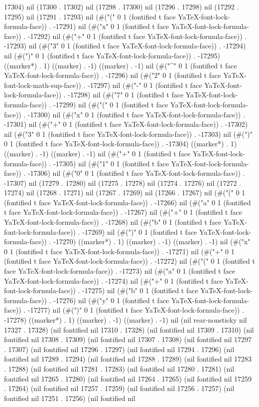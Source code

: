 17304) nil (17300 . 17302) nil (17298 . 17300) nil (17296 . 17298) nil (17292 . 17295) nil (17291 . 17293) nil (#("(" 0 1 (fontified t face YaTeX-font-lock-formula-face)) . -17291) nil (#("x" 0 1 (fontified t face YaTeX-font-lock-formula-face)) . -17292) nil (#("+" 0 1 (fontified t face YaTeX-font-lock-formula-face)) . -17293) nil (#("3" 0 1 (fontified t face YaTeX-font-lock-formula-face)) . -17294) nil (#(")" 0 1 (fontified t face YaTeX-font-lock-formula-face)) . -17295) ((marker*) . 1) ((marker) . -1) ((marker) . -1) nil (#("^" 0 1 (fontified t face YaTeX-font-lock-formula-face)) . -17296) nil (#("2" 0 1 (fontified t face YaTeX-font-lock-math-sup-face)) . -17297) nil (#("-" 0 1 (fontified t face YaTeX-font-lock-formula-face)) . -17298) nil (#("7" 0 1 (fontified t face YaTeX-font-lock-formula-face)) . -17299) nil (#("(" 0 1 (fontified t face YaTeX-font-lock-formula-face)) . -17300) nil (#("x" 0 1 (fontified t face YaTeX-font-lock-formula-face)) . -17301) nil (#("+" 0 1 (fontified t face YaTeX-font-lock-formula-face)) . -17302) nil (#("3" 0 1 (fontified t face YaTeX-font-lock-formula-face)) . -17303) nil (#(")" 0 1 (fontified t face YaTeX-font-lock-formula-face)) . -17304) ((marker*) . 1) ((marker) . -1) ((marker) . -1) nil (#("+" 0 1 (fontified t face YaTeX-font-lock-formula-face)) . -17305) nil (#("1" 0 1 (fontified t face YaTeX-font-lock-formula-face)) . -17306) nil (#("0" 0 1 (fontified t face YaTeX-font-lock-formula-face)) . -17307) nil (17279 . 17280) nil (17275 . 17278) nil (17274 . 17276) nil (17272 . 17274) nil (17268 . 17271) nil (17267 . 17269) nil (17266 . 17267) nil (#("(" 0 1 (fontified t face YaTeX-font-lock-formula-face)) . -17266) nil (#("a" 0 1 (fontified t face YaTeX-font-lock-formula-face)) . -17267) nil (#("+" 0 1 (fontified t face YaTeX-font-lock-formula-face)) . -17268) nil (#("b" 0 1 (fontified t face YaTeX-font-lock-formula-face)) . -17269) nil (#(")" 0 1 (fontified t face YaTeX-font-lock-formula-face)) . -17270) ((marker*) . 1) ((marker) . -1) ((marker) . -1) nil (#("x" 0 1 (fontified t face YaTeX-font-lock-formula-face)) . -17271) nil (#("+" 0 1 (fontified t face YaTeX-font-lock-formula-face)) . -17272) nil (#("(" 0 1 (fontified t face YaTeX-font-lock-formula-face)) . -17273) nil (#("a" 0 1 (fontified t face YaTeX-font-lock-formula-face)) . -17274) nil (#("+" 0 1 (fontified t face YaTeX-font-lock-formula-face)) . -17275) nil (#("b" 0 1 (fontified t face YaTeX-font-lock-formula-face)) . -17276) nil (#("y" 0 1 (fontified t face YaTeX-font-lock-formula-face)) . -17277) nil (#(")" 0 1 (fontified t face YaTeX-font-lock-formula-face)) . -17278) ((marker*) . 1) ((marker) . -1) ((marker) . -1) nil (nil rear-nonsticky nil 17327 . 17328) (nil fontified nil 17310 . 17328) (nil fontified nil 17309 . 17310) (nil fontified nil 17308 . 17309) (nil fontified nil 17307 . 17308) (nil fontified nil 17297 . 17307) (nil fontified nil 17296 . 17297) (nil fontified nil 17294 . 17296) (nil fontified nil 17289 . 17294) (nil fontified nil 17288 . 17289) (nil fontified nil 17283 . 17288) (nil fontified nil 17281 . 17283) (nil fontified nil 17280 . 17281) (nil fontified nil 17265 . 17280) (nil fontified nil 17264 . 17265) (nil fontified nil 17259 . 17264) (nil fontified nil 17257 . 17259) (nil fontified nil 17256 . 17257) (nil fontified nil 17251 . 17256) (nil fontified nil 